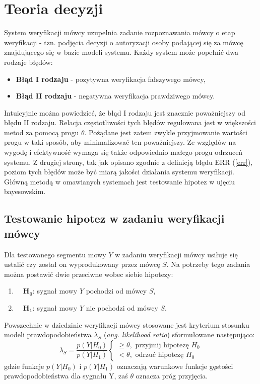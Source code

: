 \section{Teoria decyzji}
\label{verif}

System weryfikacji mówcy uzupełnia zadanie rozpoznawania mówcy o etap weryfikacji - tzn. podjęcia decyzji o autoryzacji osoby podającej się za mówcę znajdującego się w bazie modeli systemu. Każdy system może popełnić dwa rodzaje błędów:
\begin{itemize}
  \item{\textbf{Błąd I rodzaju}} - pozytywna weryfikacja fałszywego mówcy,
  \item{\textbf{Błąd II rodzaju}} - negatywna weryfikacja prawdziwego mówcy.
\end{itemize}
Intuicyjnie można powiedzieć, że błąd I rodzaju jest znacznie poważniejszy od błędu II rodzaju. Relacja częstotliwości tych błędów regulowana jest w większości metod za pomocą progu $\theta$. Pożądane jest zatem zwykle przyjmowanie wartości progu w taki sposób, aby minimalizować ten poważniejszy. Ze względów na wygodę i efektywność wymaga się także odpowiednio małego progu odrzuceń systemu. Z drugiej strony, tak jak opisano zgodnie z definicją błędu ERR (\ref{err}), poziom tych błędów
może być miarą jakości działania systemu weryfikacji. Główną metodą w omawianych systemach jest testowanie hipotez w ujęciu bayesowskim.  

\subsection{Testowanie hipotez w zadaniu weryfikacji mówcy}

Dla testowanego segmentu mowy $Y$ w zadaniu weryfikacji mówcy usiłuje się ustalić czy został on wyprodukowany przez mówcę $S$. Na potrzeby tego zadania można postawić dwie przeciwne wobec siebie hipotezy:
\begin{enumerate}
  \item{$\quad\bm{H_0}$}: sygnał mowy $Y$ pochodzi od mówcy $S$,
  \item{$\quad\bm{H_1}$}: sygnał mowy $Y$ nie pochodzi od mówcy $S$.
\end{enumerate}
Powszechnie w dziedzinie weryfikacji mówcy stosowane jest kryterium stosunku modeli prawdopodobieństwa $\lambda_S$ (\textit{ang. likelihood ratio}) sformułowane następująco:
\begin{equation}
  \label{likratio}
  \lambda_S = \frac{p(Y|H_0)}{p(Y|H_1)}
  \begin{cases}
    \ge \theta, \textrm{ przyjmij hipotezę } H_0 \\
    < \theta, \textrm{ odrzuć hipotezę } H_0
  \end{cases}
\end{equation}
gdzie funkcje $p(Y|H_0)$ i $p(Y|H_1)$ oznaczają warunkowe funkcje gęstości prawdopodobieństwa dla sygnału Y, zaś $\theta$ oznacza próg przyjęcia. 

